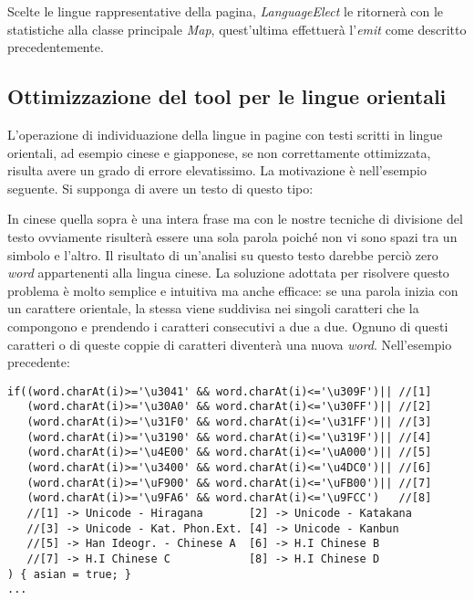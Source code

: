 \documentclass{article}
\newcommand{\class}[1]{\textit{#1}}
\begin{document}
Scelte le lingue rappresentative della pagina, \class{LanguageElect} le ritornerà con le statistiche alla classe principale \class{Map}, quest'ultima effettuerà l'\textit{emit} come descritto precedentemente. 

\subsection{Ottimizzazione del tool per le lingue orientali}

L'operazione di individuazione della lingue in pagine con testi scritti in lingue orientali, ad esempio cinese e giapponese, se non correttamente ottimizzata, risulta avere un grado di errore elevatissimo. La motivazione è nell'esempio seguente. Si supponga di avere un testo di questo tipo:
\begin{center}
\imgchina
\end{center}
In cinese quella sopra è una intera frase ma con le nostre tecniche di divisione del testo ovviamente risulterà essere una sola parola poiché non vi sono spazi tra un simbolo e l'altro. Il risultato di un'analisi su questo testo darebbe perciò zero \textit{word} appartenenti alla lingua cinese.
La soluzione adottata per risolvere questo problema è molto semplice e intuitiva ma anche efficace: se una parola inizia con un carattere orientale, la stessa viene suddivisa nei singoli caratteri che la compongono e prendendo i caratteri consecutivi a due a due. Ognuno di questi caratteri o di queste coppie di caratteri diventerà una nuova \textit{word}. Nell'esempio precedente:
\begin{center}
\imgchinasplitted
\end{center}
\begin{verbatim}
if((word.charAt(i)>='\u3041' && word.charAt(i)<='\u309F')|| //[1]
   (word.charAt(i)>='\u30A0' && word.charAt(i)<='\u30FF')|| //[2] 
   (word.charAt(i)>='\u31F0' && word.charAt(i)<='\u31FF')|| //[3] 
   (word.charAt(i)>='\u3190' && word.charAt(i)<='\u319F')|| //[4]
   (word.charAt(i)>='\u4E00' && word.charAt(i)<='\uA000')|| //[5]
   (word.charAt(i)>='\u3400' && word.charAt(i)<='\u4DC0')|| //[6]
   (word.charAt(i)>='\uF900' && word.charAt(i)<='\uFB00')|| //[7]
   (word.charAt(i)>='\u9FA6' && word.charAt(i)<='\u9FCC')   //[8] 
   //[1] -> Unicode - Hiragana       [2] -> Unicode - Katakana
   //[3] -> Unicode - Kat. Phon.Ext. [4] -> Unicode - Kanbun
   //[5] -> Han Ideogr. - Chinese A  [6] -> H.I Chinese B
   //[7] -> H.I Chinese C            [8] -> H.I Chinese D
) { asian = true; }
...
\end{verbatim}
\end{document}
